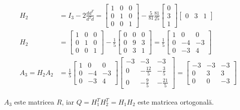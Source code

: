 \documentclass{exam}
\begin{document}
\begin{align*}
	H_2           & = I_3 - 2 \frac{d d^T}{d^T d} = \begin{bmatrix} 1 & 0 & 0 \\ 0 & 1 & 0 \\ 0 & 0 & 1 \end{bmatrix} - \frac{5}{81} \frac{81}{25} \begin{bmatrix} 0 \\ 3 \\ 1 \end{bmatrix} \begin{bmatrix} 0 & 3 & 1 \end{bmatrix}                                                              \\
	H_2           & = \begin{bmatrix} 1 & 0 & 0 \\ 0 & 1 & 0 \\ 0 & 0 & 1 \end{bmatrix} - \frac{1}{5} \begin{bmatrix} 0 & 0 & 0 \\ 0 & 9 & 3 \\ 0 & 3 & 1 \end{bmatrix} = \frac{1}{5} \begin{bmatrix} 1 & 0 & 0 \\ 0 & -4 & -3 \\ 0 & -3 & 4 \end{bmatrix}                                        \\
	A_3 = H_2 A_2 & = \frac{1}{5} \begin{bmatrix} 1 & 0 & 0 \\ 0 & -4 & -3 \\ 0 & -3 & 4 \end{bmatrix} \begin{bmatrix} -3 & -3 & -3 \\ 0 & -\frac{12}{5} & -\frac{3}{5} \\ 0 & -\frac{9}{5} & -\frac{21}{5} \end{bmatrix} = \begin{bmatrix} -3 & -3 & -3 \\ 0 & 3 & 3 \\ 0 & 0 & -3 \end{bmatrix}
\end{align*}

$A_3$ este matricea $R$, iar $Q = H_1^T H_2^T = H_1 H_2$ este matricea
ortogonală.
\end{document}
